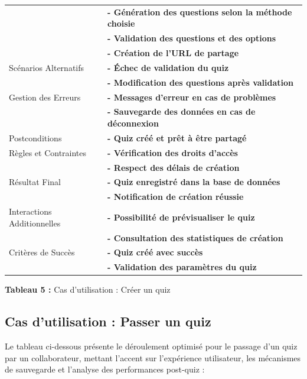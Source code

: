 \documentclass[12pt,a4paper]{report}
\begin{document}
\begin{longtable}[]{@{}
  >{\raggedright\arraybackslash}p{}
  >{\raggedright\arraybackslash}p{}@{}}
& \textbf{- Génération des questions selon la méthode choisie} \\
& \textbf{- Validation des questions et des options} \\
& \textbf{- Création de l'URL de partage} \\
Scénarios Alternatifs & \textbf{- Échec de validation du quiz} \\
& \textbf{- Modification des questions après validation} \\
Gestion des Erreurs & \textbf{- Messages d'erreur en cas de problèmes} \\
& \textbf{- Sauvegarde des données en cas de déconnexion} \\
Postconditions & \textbf{- Quiz créé et prêt à être partagé} \\
Règles et Contraintes & \textbf{- Vérification des droits d'accès} \\
& \textbf{- Respect des délais de création} \\
Résultat Final & \textbf{- Quiz enregistré dans la base de données} \\
& \textbf{- Notification de création réussie} \\
Interactions Additionnelles & \textbf{- Possibilité de prévisualiser le quiz} \\
& \textbf{- Consultation des statistiques de création} \\
Critères de Succès & \textbf{- Quiz créé avec succès} \\
& \textbf{- Validation des paramètres du quiz} \\
\bottomrule()
\end{longtable}

\begin{center}
\textbf{Tableau 5 :} Cas d'utilisation : Créer un quiz
\end{center}

\subsection{Cas d'utilisation : Passer un quiz}

Le tableau ci-dessous présente le déroulement optimisé pour le passage d'un quiz par un collaborateur, mettant l'accent sur l'expérience utilisateur, les mécanismes de sauvegarde et l'analyse des performances post-quiz :
\end{document}
